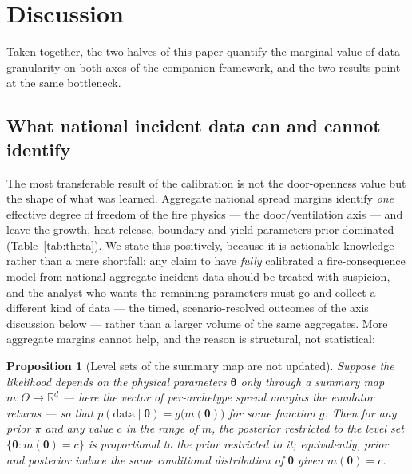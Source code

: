\documentclass[11pt]{article}
\newtheorem{proposition}{Proposition}
\begin{document}
\section{Discussion}
\label{sec:discussion}

Taken together, the two halves of this paper quantify the marginal value of
data granularity on both axes of the companion framework, and the two results
point at the same bottleneck.

\subsection{What national incident data can and cannot identify}
\label{sec:discussion:identify}

The most transferable result of the calibration is not the door-openness value
but the shape of what was learned. Aggregate national spread margins identify
\emph{one} effective degree of freedom of the fire physics --- the
door/ventilation axis --- and leave the growth, heat-release, boundary and yield
parameters prior-dominated (Table~\ref{tab:theta}). We state this positively,
because it is actionable knowledge rather than a mere shortfall: any claim to
have \emph{fully} calibrated a fire-consequence model from national aggregate
incident data should be treated with suspicion, and the analyst who wants the
remaining parameters must go and collect a different kind of data --- the timed,
scenario-resolved outcomes of the axis discussion below --- rather than a larger
volume of the same aggregates. More aggregate margins cannot help, and the
reason is structural, not statistical:

\begin{proposition}[Level sets of the summary map are not updated]
\label{prop:levelset}
Suppose the likelihood depends on the physical parameters $\boldsymbol\theta$
only through a summary map $m:\Theta\to\mathbb{R}^{d}$ --- here the vector of
per-archetype spread margins the emulator returns --- so that
$p(\mathrm{data}\mid\boldsymbol\theta)=g\big(m(\boldsymbol\theta)\big)$ for some
function $g$. Then for any prior $\pi$ and any value $c$ in the range of $m$,
the posterior restricted to the level set
$\{\boldsymbol\theta:m(\boldsymbol\theta)=c\}$ is proportional to the prior
restricted to it; equivalently, prior and posterior induce the same conditional
distribution of $\boldsymbol\theta$ given $m(\boldsymbol\theta)=c$.
\end{proposition}
\end{document}
